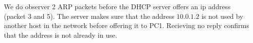 We do observer 2 ARP packets before the DHCP server offers an ip address (packet 3 and 5). The server makes sure that the address $10.0.1.2$ is not used by another host in the network before offering it to PC1. Recieving no reply confirms that the address is not already in use.
